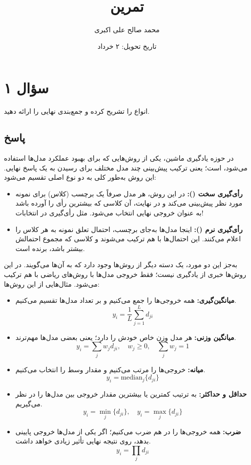 \documentclass[12pt]{article}
\title{تمرین \lr{Voting} \lr{by} \lr{Ensemble}}
\author{محمد صالح علی اکبری}
\date{تاریخ تحویل: ۲ خرداد}
\begin{document}
	
	\maketitle
	
	\section*{سؤال ۱}
	انواع  را تشریح کرده و جمع‌بندی نهایی را ارائه دهید.
	
	\subsection*{پاسخ}
	در حوزه یادگیری ماشین، یکی از روش‌هایی که برای بهبود عملکرد مدل‌ها استفاده می‌شود،  است؛ یعنی ترکیب پیش‌بینی چند مدل مختلف برای رسیدن به یک پاسخ نهایی. این روش به‌طور کلی به دو نوع اصلی تقسیم می‌شود:
	
	\begin{itemize}
		\item \textbf{رأی‌گیری سخت ():} در این روش، هر مدل صرفاً یک برچسب (کلاس) برای نمونه مورد نظر پیش‌بینی می‌کند و در نهایت، آن کلاسی که بیشترین رأی را آورده باشد به عنوان خروجی نهایی انتخاب می‌شود. مثل رأی‌گیری در انتخابات!
		
		\item \textbf{رأی‌گیری نرم ():} اینجا مدل‌ها به‌جای برچسب، احتمال تعلق نمونه به هر کلاس را اعلام می‌کنند. این احتمال‌ها با هم ترکیب می‌شوند و کلاسی که مجموع احتمالش بیشتر باشد، برنده است.
	\end{itemize}
	
	به‌جز این دو مورد، یک دسته دیگر از روش‌ها وجود دارد که به آن‌ها  می‌گویند. در این روش‌ها خبری از یادگیری نیست؛ فقط خروجی مدل‌ها با روش‌های ریاضی با هم ترکیب می‌شود. مثال‌هایی از این روش‌ها:
	
	\begin{itemize}
		\item \textbf{میانگین‌گیری:} همه خروجی‌ها را جمع می‌کنیم و بر تعداد مدل‌ها تقسیم می‌کنیم.
		\[ y_i = \frac{1}{L} \sum_{j=1}^{L} d_{ji} \]
		
		\item \textbf{میانگین وزنی:} هر مدل وزن خاص خودش را دارد؛ یعنی بعضی مدل‌ها مهم‌ترند.
		\[ y_i = \sum_{j} w_j d_{ji}, \quad w_j \geq 0, \quad \sum_{j} w_j = 1 \]
		
		\item \textbf{میانه:} خروجی‌ها را مرتب می‌کنیم و مقدار وسط را انتخاب می‌کنیم.
		\[ y_i = \text{median}_j \{ d_{ji} \} \]
		
		\item \textbf{حداقل و حداکثر:} به ترتیب کمترین یا بیشترین مقدار خروجی بین مدل‌ها را در نظر می‌گیریم.
		\[ y_i = \min_j \{ d_{ji} \}, \quad y_i = \max_j \{ d_{ji} \} \]
		
		\item \textbf{ضرب:} همه خروجی‌ها را در هم ضرب می‌کنیم؛ اگر یکی از مدل‌ها خروجی پایینی بدهد، روی نتیجه نهایی تأثیر زیادی خواهد داشت.
		\[ y_i = \prod_{j} d_{ji} \]
	\end{itemize}
	
\end{document}
